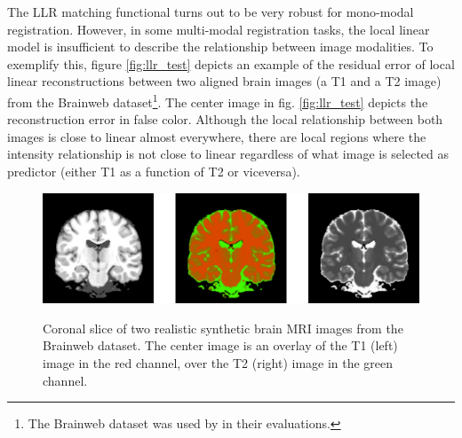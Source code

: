 The LLR matching functional turns out to be very robust for mono-modal registration. However, in some multi-modal registration tasks, the local linear model is insufficient to describe the relationship between image modalities. To exemplify this, figure \ref{fig:llr_test} depicts an example of the residual error of local linear reconstructions between two aligned brain images (a T1 and a T2 image) from the Brainweb dataset\footnote{The Brainweb dataset was used by \cite{Wang2014} in their evaluations.}. The center image in fig. \ref{fig:llr_test} depicts the reconstruction error in false color. Although the local relationship between both images is close to linear almost everywhere, there are local regions where the intensity relationship is not close to linear regardless of what image is selected as predictor (either T1 as a function of T2 or viceversa).\\

\begin{figure}[t!]
\centering
    \includegraphics[width=1.0\linewidth]{./images/brainweb_t1_t2_overlay.png}\\
    \caption{Coronal slice of two realistic synthetic brain MRI images from the Brainweb dataset. The center image is an overlay of the T1 (left) image in the red channel, over the T2 (right) image in the green channel.}
\label{fig:brainweb_t1_t2}
\end{figure}

